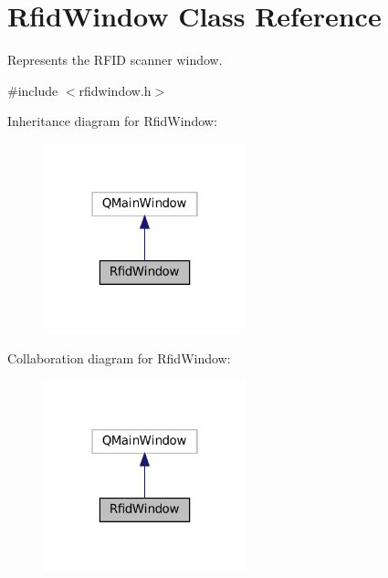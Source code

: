 \hypertarget{classRfidWindow}{}\section{Rfid\+Window Class Reference}
\label{classRfidWindow}


Represents the R\+F\+ID scanner window.  




{\ttfamily \#include $<$rfidwindow.\+h$>$}



Inheritance diagram for Rfid\+Window\+:
\nopagebreak
\begin{figure}[H]
\begin{center}
\leavevmode
\includegraphics[width=166pt]{classRfidWindow__inherit__graph}
\end{center}
\end{figure}


Collaboration diagram for Rfid\+Window\+:
\nopagebreak
\begin{figure}[H]
\begin{center}
\leavevmode
\includegraphics[width=166pt]{classRfidWindow__coll__graph}
\end{center}
\end{figure}
